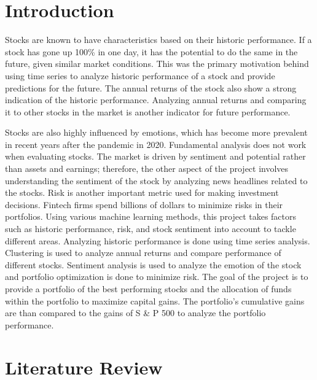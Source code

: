 \documentclass[12pt,a4paper, twoside]{article}
\begin{document}
\vspace{0.5cm}
\begin{multicols}{2}
\section{Introduction}
    \indent 
    Stocks are known to have characteristics based on their historic performance. If a stock has gone up 100\% in one day, it has the potential to do the same in the future, given similar market conditions. This was the primary motivation behind using time series to analyze historic performance of a stock and provide predictions for the future. The annual returns of the stock also show a strong indication of the historic performance. Analyzing annual returns and comparing it to other stocks in the market is another indicator for future performance.
    
    Stocks are also highly influenced by emotions, which has become more prevalent in recent years after the pandemic in 2020. Fundamental analysis does not work when evaluating stocks. The market is driven by sentiment and potential rather than assets and earnings; therefore, the other aspect of the project involves understanding the sentiment of the stock by analyzing news headlines related to the stocks.
    \newline
    \indent 
    Risk is another important metric used for making investment decisions. Fintech firms spend billions of dollars to minimize risks in their portfolios. Using various machine learning methods, this project takes factors such as historic performance, risk, and stock sentiment into account to tackle different areas. Analyzing historic performance is done using time series analysis. Clustering is used to analyze annual returns and compare performance of different stocks. Sentiment analysis is used to analyze the emotion of the stock and portfolio optimization is done to minimize risk. The goal of the project is to provide a portfolio of the best performing stocks and the allocation of funds within the portfolio to maximize capital gains. The portfolio’s cumulative gains are than compared to the gains of S \& P 500 to analyze the portfolio performance.

\section{Literature Review}

\end{multicols}
\end{document}
